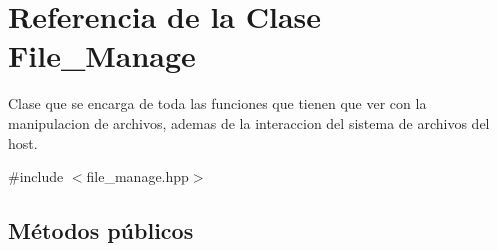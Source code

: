 \hypertarget{class_file___manage}{}\section{Referencia de la Clase File\+\_\+\+Manage}
\label{class_file___manage}


Clase que se encarga de toda las funciones que tienen que ver con la manipulacion de archivos, ademas de la interaccion del sistema de archivos del host.  




{\ttfamily \#include $<$file\+\_\+manage.\+hpp$>$}

\subsection*{Métodos públicos}
